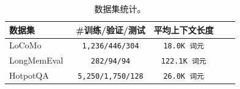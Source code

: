 \begin{table}[h]
\centering
\small
\caption{数据集统计。}
\label{tab:dataset_stats}
\begin{tabular}{lcccc}
\toprule
\textbf{数据集} & \textbf{\#训练/验证/测试} & \textbf{平均上下文长度} \\
\midrule
LoCoMo~\cite{maharana2024evaluating-locomo}      & \texttt{1,236/446/304} & \texttt{18.0K 词元} \\
LongMemEval~\cite{wu2024longmemeval} & \texttt{282/94/94} & \texttt{122.1K 词元} \\
HotpotQA~\cite{yang2018hotpotqa, yu2025memagent}    & \texttt{5,250/1,750/128} & \texttt{26.0K 词元} \\
\bottomrule
\end{tabular}
\end{table}
